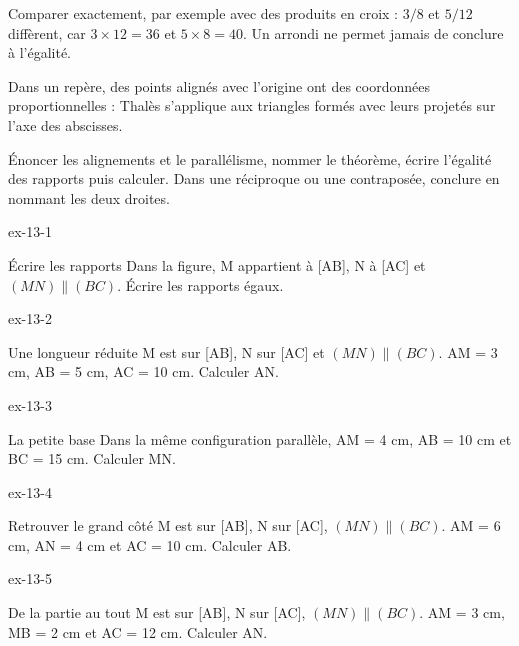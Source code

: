 \begin{savoirfaire}Comparer exactement, par exemple avec des produits en croix : $3/8$ et $5/12$ diffèrent, car $3\times12=36$ et $5\times8=40$. Un arrondi ne permet jamais de conclure à l’égalité.\end{savoirfaire}
\begin{propriete}Dans un repère, des points alignés avec l’origine ont des coordonnées proportionnelles : Thalès s’applique aux triangles formés avec leurs projetés sur l’axe des abscisses.\end{propriete}
\begin{savoirfaire}[Rédiger]Énoncer les alignements et le parallélisme, nommer le théorème, écrire l’égalité des rapports puis calculer. Dans une réciproque ou une contraposée, conclure en nommant les deux droites.\end{savoirfaire}
\clearpage{}
\begin{blocLivre}{ex-13-1}\begin{exercice}[1]{Écrire les rapports}
Dans la figure, M appartient à [AB], N à [AC] et $(MN)\parallel(BC)$. Écrire les rapports égaux.
\label{fig-ex-13-1}
\end{exercice}\end{blocLivre}
\begin{blocLivre}{ex-13-2}\begin{exercice}[1]{Une longueur réduite}
M est sur [AB], N sur [AC] et $(MN)\parallel(BC)$. AM = 3 cm, AB = 5 cm, AC = 10 cm. Calculer AN.
\label{fig-ex-13-2}
\end{exercice}\end{blocLivre}
\begin{blocLivre}{ex-13-3}\begin{exercice}[1]{La petite base}
Dans la même configuration parallèle, AM = 4 cm, AB = 10 cm et BC = 15 cm. Calculer MN.
\label{fig-ex-13-3}
\end{exercice}\end{blocLivre}
\begin{blocLivre}{ex-13-4}\begin{exercice}[1]{Retrouver le grand côté}
M est sur [AB], N sur [AC], $(MN)\parallel(BC)$. AM = 6 cm, AN = 4 cm et AC = 10 cm. Calculer AB.
\label{fig-ex-13-4}
\end{exercice}\end{blocLivre}
\begin{blocLivre}{ex-13-5}\begin{exercice}[1]{De la partie au tout}
M est sur [AB], N sur [AC], $(MN)\parallel(BC)$. AM = 3 cm, MB = 2 cm et AC = 12 cm. Calculer AN.
\label{fig-ex-13-5}
\end{exercice}\end{blocLivre}

